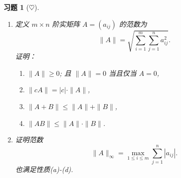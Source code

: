 \documentclass[UTF8]{ctexart}
\newtheorem{ex}[thm]{习题}
\begin{document}
\begin{ex}[$\heartsuit $]
	\begin{enumerate}
	\item 定义 $m \times n$ 阶实矩阵 $A=(a_{ij})$ 的范数为
	$$ 	\|A\|= \sqrt{ \sum_{i=1}^m \sum_{j=1}^n a_{ij}^2}. 	$$
	证明：
	\begin{enumerate}
		\item $\|A\| \geq 0$; 且 $\|A\|=0$ 当且仅当 $A=0$,
		\item $\|cA\| = |c|\cdot\|A\|$,
		\item $\|A+B\|\leq\|A\|+\|B\|$,
		\item $\|AB\|\leq\|A\|\cdot\|B\|$.
	\end{enumerate}
   \item 证明范数
	$$ \|A\|_{\infty} = \max_{1\leq i\leq m} \sum_{j=1}^n |a_{ij}|.
	$$
	也满足性质(a)-(d).
	\end{enumerate}
\end{ex}
\end{document}
